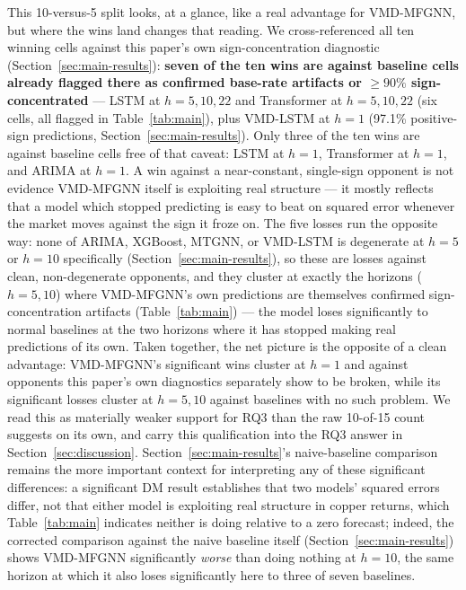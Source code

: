 \documentclass[journal]{IEEEtran}
\begin{document}
This 10-versus-5 split looks, at a glance, like a real advantage for VMD-MFGNN, but where the wins land changes that reading. We cross-referenced all ten winning cells against this paper's own sign-concentration diagnostic (Section~\ref{sec:main-results}): \textbf{seven of the ten wins are against baseline cells already flagged there as confirmed base-rate artifacts or $\geq90\%$ sign-concentrated} --- LSTM at $h=5,10,22$ and Transformer at $h=5,10,22$ (six cells, all flagged in Table~\ref{tab:main}), plus VMD-LSTM at $h=1$ (97.1\% positive-sign predictions, Section~\ref{sec:main-results}). Only three of the ten wins are against baseline cells free of that caveat: LSTM at $h=1$, Transformer at $h=1$, and ARIMA at $h=1$. A win against a near-constant, single-sign opponent is not evidence VMD-MFGNN itself is exploiting real structure --- it mostly reflects that a model which stopped predicting is easy to beat on squared error whenever the market moves against the sign it froze on. The five losses run the opposite way: none of ARIMA, XGBoost, MTGNN, or VMD-LSTM is degenerate at $h=5$ or $h=10$ specifically (Section~\ref{sec:main-results}), so these are losses against clean, non-degenerate opponents, and they cluster at exactly the horizons ($h=5,10$) where VMD-MFGNN's own predictions are themselves confirmed sign-concentration artifacts (Table~\ref{tab:main}) --- the model loses significantly to normal baselines at the two horizons where it has stopped making real predictions of its own. Taken together, the net picture is the opposite of a clean advantage: VMD-MFGNN's significant wins cluster at $h=1$ and against opponents this paper's own diagnostics separately show to be broken, while its significant losses cluster at $h=5,10$ against baselines with no such problem. We read this as materially weaker support for RQ3 than the raw 10-of-15 count suggests on its own, and carry this qualification into the RQ3 answer in Section~\ref{sec:discussion}. Section~\ref{sec:main-results}'s naive-baseline comparison remains the more important context for interpreting any of these significant differences: a significant DM result establishes that two models' squared errors differ, not that either model is exploiting real structure in copper returns, which Table~\ref{tab:main} indicates neither is doing relative to a zero forecast; indeed, the corrected comparison against the naive baseline itself (Section~\ref{sec:main-results}) shows VMD-MFGNN significantly \emph{worse} than doing nothing at $h=10$, the same horizon at which it also loses significantly here to three of seven baselines.
\end{document}

